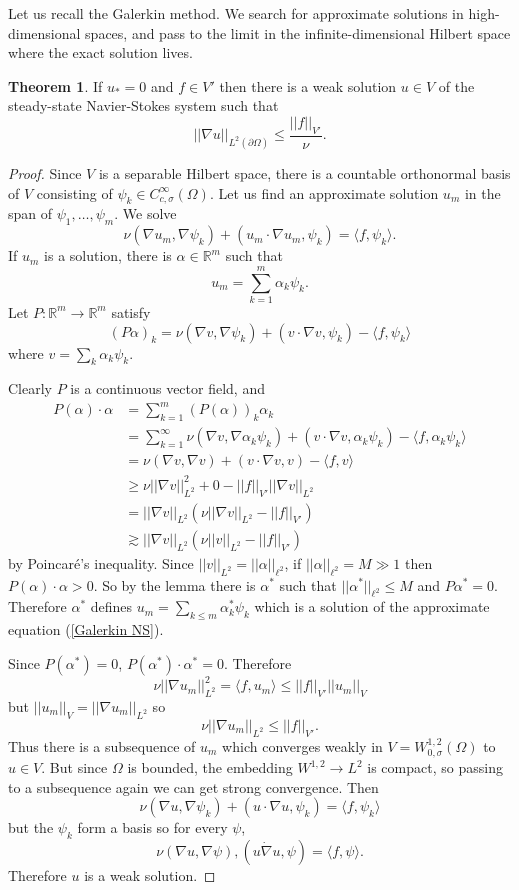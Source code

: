 \documentclass[12pt]{book}
\newcommand{\RR}{\mathbb{R}}
\theoremstyle{definition}
\newtheorem{theorem}{Theorem}[chapter]
\begin{document}
Let us recall the Galerkin method.
We search for approximate solutions in high-dimensional spaces, and pass to the limit in the infinite-dimensional Hilbert space where the exact solution lives.

\begin{theorem}
If $u_* = 0$ and $f \in V'$ then there is a weak solution $u \in V$ of the steady-state Navier-Stokes system such that
$$||\nabla u||_{L^2(\partial \Omega)} \leq \frac{||f||_{V'}}{\nu}.$$
\end{theorem}
\begin{proof}
Since $V$ is a separable Hilbert space, there is a countable orthonormal basis of $V$ consisting of $\psi_k \in C^\infty_{c,\sigma}(\Omega)$.
Let us find an approximate solution $u_m$ in the span of $\psi_1, \dots, \psi_m$.
We solve
\begin{equation}
\label{Galerkin NS}
\nu(\nabla u_m, \nabla \psi_k) + (u_m \cdot \nabla u_m, \psi_k) = \langle f, \psi_k\rangle.
\end{equation}
If $u_m$ is a solution, there is $\alpha \in \RR^m$ such that
$$u_m = \sum_{k=1}^m \alpha_k \psi_k.$$
Let $P: \RR^m \to \RR^m$ satisfy
$$(P\alpha)_k = \nu(\nabla v, \nabla \psi_k) + (v \cdot \nabla v, \psi_k) - \langle f,\psi_k\rangle$$
where $v = \sum_k \alpha_k \psi_k$.

Clearly $P$ is a continuous vector field, and
\begin{align*}
P(\alpha) \cdot \alpha &= \sum_{k=1}^m (P(\alpha))_k \alpha_k\\
&= \sum_{k=1}^\infty \nu(\nabla v, \nabla \alpha_k \psi_k) + (v \cdot \nabla v, \alpha_k \psi_k) - \langle f, \alpha_k \psi_k\rangle\\
&= \nu(\nabla v, \nabla v) + (v \cdot \nabla v, v) - \langle f,v\rangle\\
&\geq \nu||\nabla v||_{L^2}^2 + 0 - ||f||_{V'} ||\nabla v||_{L^2}\\
&= ||\nabla v||_{L^2}(\nu ||\nabla v||_{L^2} - ||f||_{V'})\\
&\gtrsim ||\nabla v||_{L^2}(\nu ||v||_{L^2} - ||f||_{V'})
\end{align*}
by Poincar\'e's inequality. Since $||v||_{L^2} = ||\alpha||_{\ell^2}$, if $||\alpha||_{\ell^2} = M \gg 1$ then $P(\alpha) \cdot \alpha > 0$.
So by the lemma there is $\alpha^*$ such that $||\alpha^*||_{\ell^2} \leq M$ and $P\alpha^* = 0$.
Therefore $\alpha^*$ defines $u_m = \sum_{k \leq m} \alpha_k^*\psi_k$ which is a solution of the approximate equation (\ref{Galerkin NS}).

Since $P(\alpha^*) = 0$, $P(\alpha^*) \cdot \alpha^* = 0$.
Therefore
$$\nu ||\nabla u_m||_{L^2}^2 = \langle f, u_m\rangle \leq ||f||_{V'} ||u_m||_V$$
but $||u_m||_V = ||\nabla u_m||_{L^2}$ so
$$\nu ||\nabla u_m||_{L^2} \leq ||f||_{V'}.$$
Thus there is a subsequence of $u_m$ which converges weakly in $V = W^{1,2}_{0,\sigma}(\Omega)$ to $u \in V$.
But since $\Omega$ is bounded, the embedding $W^{1,2} \to L^2$ is compact, so passing to a subsequence again we can get strong convergence.
Then
$$\nu(\nabla u, \nabla \psi_k) + (u \cdot \nabla u, \psi_k) = \langle f, \psi_k\rangle$$
but the $\psi_k$ form a basis so for every $\psi$,
$$\nu(\nabla u, \nabla \psi), (u \dot \nabla u, \psi) = \langle f, \psi\rangle.$$
Therefore $u$ is a weak solution.


\end{proof}
\end{document}
